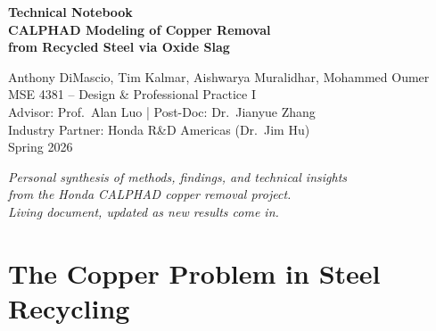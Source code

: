 \documentclass[11pt]{article}
\begin{document}
\thispagestyle{fancy}
\vspace*{\fill}

\begin{center}
{\LARGE\bfseries Technical Notebook\\[0.3em]
\large CALPHAD Modeling of Copper Removal\\from Recycled Steel via Oxide Slag\par}
\end{center}

\vspace{0.8in}

\begin{center}
{\large
Anthony DiMascio, Tim Kalmar, Aishwarya Muralidhar, Mohammed Oumer\\[1em]
MSE 4381 -- Design \& Professional Practice I\\
Advisor: Prof.\ Alan Luo | Post-Doc: Dr.\ Jianyue Zhang\\
Industry Partner: Honda R\&D Americas (Dr.\ Jim Hu)\\[0.5em]
Spring 2026\par}
\end{center}

\vspace{0.8in}

\begin{center}
\textit{Personal synthesis of methods, findings, and technical insights\\
from the Honda CALPHAD copper removal project.\\[0.5em]
Living document, updated as new results come in.}
\end{center}

\vspace*{\fill}
\newpage

\tableofcontents
\newpage

\section{The Copper Problem in Steel Recycling}
\end{document}
